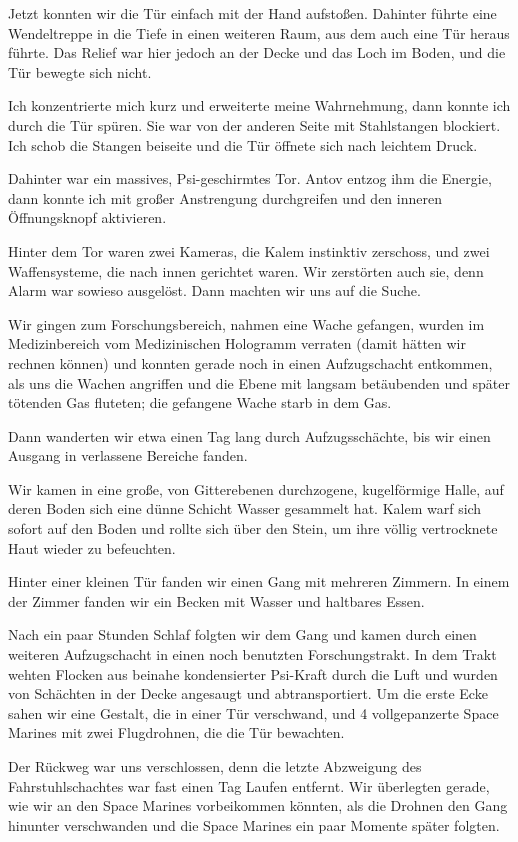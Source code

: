 \documentclass[11pt]{article}
\begin{document}
Jetzt konnten wir die Tür einfach mit der Hand aufstoßen. Dahinter
führte eine Wendeltreppe in die Tiefe in einen weiteren Raum, aus dem
auch eine Tür heraus führte. Das Relief war hier jedoch an der Decke und
das Loch im Boden, und die Tür bewegte sich nicht.

Ich konzentrierte mich kurz und erweiterte meine Wahrnehmung, dann
konnte ich durch die Tür spüren. Sie war von der anderen Seite mit
Stahlstangen blockiert. Ich schob die Stangen beiseite und die Tür
öffnete sich nach leichtem Druck.

Dahinter war ein massives, Psi-geschirmtes Tor. Antov entzog ihm die
Energie, dann konnte ich mit großer Anstrengung durchgreifen und den
inneren Öffnungsknopf aktivieren.

Hinter dem Tor waren zwei Kameras, die Kalem instinktiv zerschoss, und
zwei Waffensysteme, die nach innen gerichtet waren. Wir zerstörten auch
sie, denn Alarm war sowieso ausgelöst. Dann machten wir uns auf die
Suche.

Wir gingen zum Forschungsbereich, nahmen eine Wache gefangen, wurden im
Medizinbereich vom Medizinischen Hologramm verraten (damit hätten wir
rechnen können) und konnten gerade noch in einen Aufzugschacht
entkommen, als uns die Wachen angriffen und die Ebene mit langsam
betäubenden und später tötenden Gas fluteten; die gefangene Wache starb
in dem Gas.

Dann wanderten wir etwa einen Tag lang durch Aufzugsschächte, bis wir
einen Ausgang in verlassene Bereiche fanden.

Wir kamen in eine große, von Gitterebenen durchzogene, kugelförmige
Halle, auf deren Boden sich eine dünne Schicht Wasser gesammelt hat.
Kalem warf sich sofort auf den Boden und rollte sich über den Stein, um
ihre völlig vertrocknete Haut wieder zu befeuchten.

Hinter einer kleinen Tür fanden wir einen Gang mit mehreren Zimmern. In
einem der Zimmer fanden wir ein Becken mit Wasser und haltbares Essen.

Nach ein paar Stunden Schlaf folgten wir dem Gang und kamen durch einen
weiteren Aufzugschacht in einen noch benutzten Forschungstrakt. In dem
Trakt wehten Flocken aus beinahe kondensierter Psi-Kraft durch die Luft
und wurden von Schächten in der Decke angesaugt und abtransportiert. Um
die erste Ecke sahen wir eine Gestalt, die in einer Tür verschwand, und
4 vollgepanzerte Space Marines mit zwei Flugdrohnen, die die Tür
bewachten.

Der Rückweg war uns verschlossen, denn die letzte Abzweigung des
Fahrstuhlschachtes war fast einen Tag Laufen entfernt. Wir überlegten
gerade, wie wir an den Space Marines vorbeikommen könnten, als die
Drohnen den Gang hinunter verschwanden und die Space Marines ein paar
Momente später folgten.
\end{document}
